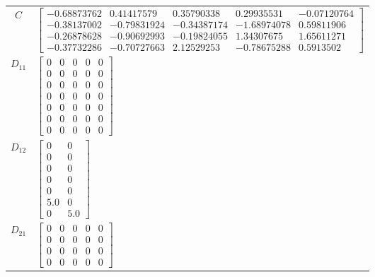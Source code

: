 \begin{tabular}{cl}
   $C$    & $\left[\begin{matrix}-0.68873762 & 0.41417579 & 0.35790338 & 0.29935531 & -0.07120764\\-0.38137002 & -0.79831924 & -0.34387174 & -1.68974078 & 0.59811906\\-0.26878628 & -0.90692993 & -0.19824055 & 1.34307675 & 1.65611271\\-0.37732286 & -0.70727663 & 2.12529253 & -0.78675288 & 0.5913502\end{matrix}\right]$                                                                    \\
 $D_{11}$ & $\left[\begin{matrix}0 & 0 & 0 & 0 & 0\\0 & 0 & 0 & 0 & 0\\0 & 0 & 0 & 0 & 0\\0 & 0 & 0 & 0 & 0\\0 & 0 & 0 & 0 & 0\\0 & 0 & 0 & 0 & 0\\0 & 0 & 0 & 0 & 0\end{matrix}\right]$                                                                                                                                                                                                          \\
 $D_{12}$ & $\left[\begin{matrix}0 & 0\\0 & 0\\0 & 0\\0 & 0\\0 & 0\\5.0 & 0\\0 & 5.0\end{matrix}\right]$                                                                                                                                                                                                                                                                                          \\
 $D_{21}$ & $\left[\begin{matrix}0 & 0 & 0 & 0 & 0\\0 & 0 & 0 & 0 & 0\\0 & 0 & 0 & 0 & 0\\0 & 0 & 0 & 0 & 0\end{matrix}\right]$                                                                                                                                                                                                                                                                   \\
\hline
\end{tabular}